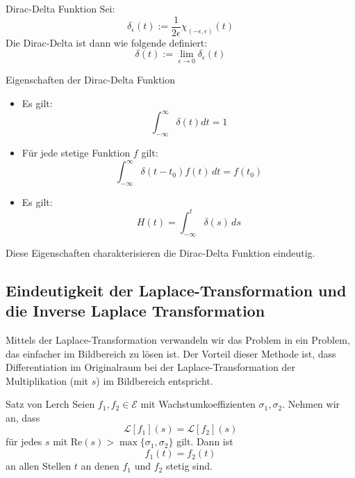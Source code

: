 \documentclass[a4paper,10pt]{article}
\def\Re{\text{Re}}
\begin{document}
\begin{subbox}{Dirac-Delta Funktion}
  Sei: \begin{equation*} \delta_\epsilon(t):= \frac{1}{2\epsilon}\chi_{(-\epsilon,\epsilon)}(t) \end{equation*} Die Dirac-Delta ist dann wie folgende definiert: \begin{equation*} \delta(t):=\lim_{\epsilon\to0}\delta_\epsilon(t) \end{equation*}
\end{subbox}

\begin{subbox}{Eigenschaften der Dirac-Delta Funktion}
  \begin{itemize}
    \item{
      Es gilt:
      $$
        \int_{-\infty}^\infty \delta(t) dt = 1
      $$
    }

    \item{
      Für jede stetige Funktion $f$ gilt:
      \begin{equation*}
        \int_{-\infty}^\infty\delta(t-t_0)f(t)\,dt=f(t_0)
    \end{equation*}
    }

    \item{
      Es gilt:
      \begin{equation*}
        H(t)=\int_{-\infty}^t\delta(s)\,ds
    \end{equation*}
    }
  \end{itemize}
  Diese Eigenschaften charakterisieren die Dirac-Delta Funktion eindeutig.
\end{subbox}

\subsection{Eindeutigkeit der Laplace-Transformation und die Inverse Laplace Transformation}

Mittels der Laplace-Transformation verwandeln wir das Problem in ein Problem, das einfacher im Bildbereich zu lösen ist. Der Vorteil dieser Methode ist, dass Differentiation im Originalraum bei der Laplace-Transformation der Multiplikation (mit $s$) im Bildbereich entspricht.

\begin{subbox}{Satz von Lerch}
  Seien \(f_1,f_2\in\mathcal{E}\) mit Wachstumkoeffizienten \(\sigma_1,\sigma_2\). Nehmen wir an, dass \begin{equation*} \mathcal{L}[f_1](s)=\mathcal{L}[f_2](s) \end{equation*} für jedes \(s\) mit \(\Re (s)>\max\{\sigma_1,\sigma_2\}\) gilt. Dann ist \begin{equation*} f_1(t)=f_2(t) \end{equation*} an allen Stellen \(t\) an denen \(f_1\) und \(f_2\) stetig sind.
\end{subbox}
\end{document}
